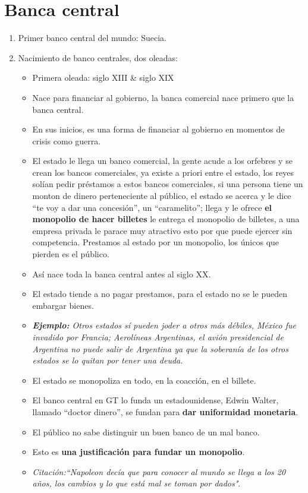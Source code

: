 \section{Banca central}
\begin{enumerate}
    \item Primer banco central del mundo: Suecia.
    \item Nacimiento de banco centrales, dos oleadas: 
        \begin{itemize}
            \item Primera oleada: siglo XIII \& siglo XIX
            \item Nace para financiar al gobierno, la banca comercial nace primero que la banca central.
            \item En sus inicios, es una forma de financiar al gobierno en momentos de crisis como guerra.
            \item El estado le llega un banco comercial, la gente acude a los orfebres y se crean los bancos comerciales, ya existe a priori entre el estado, los reyes solían pedir préstamos a estos bancos comerciales, si una persona tiene un monton de dinero perteneciente al público, el estado se acerca y le dice ``te voy a dar una concesión'', un ``caramelito''; llega y le ofrece \textbf{el monopolio de hacer billetes} le entrega el monopolio de billetes, a una empresa privada le parace muy atractivo esto por que puede ejercer sin competencia. Prestamos al estado por un monopolio, los únicos que pierden es el público.
            \item Así nace toda la banca central antes al siglo XX.
            \item El estado tiende a no pagar prestamos, para el estado no se le pueden embargar bienes.
            \item \emph{\textbf{Ejemplo: }Otros estados sí pueden joder a otros más débiles, México fue invadido por Francia; Aerolíneas Argentinas, el avión presidencial de Argentina no puede salir de Argentina ya que la soberanía de los otros estados se lo quitan por tener una deuda.}
            \item El estado se monopoliza en todo, en la coacción, en el billete.
            \item El banco central en GT lo funda un estadounidense, Edwin Walter, llamado ``doctor dinero'', se fundan para \textbf{dar uniformidad monetaria}.
            \item El público no sabe distinguir un buen banco de un mal banco.
            \item Esto es \textbf{una justificación para fundar un monopolio}.
            \item \emph{Citación:``Napoleon decía que para conocer al mundo se llega a los 20 años, los cambios y lo que está mal se toman por dados"}.
        \end{itemize}
    

\end{enumerate}
